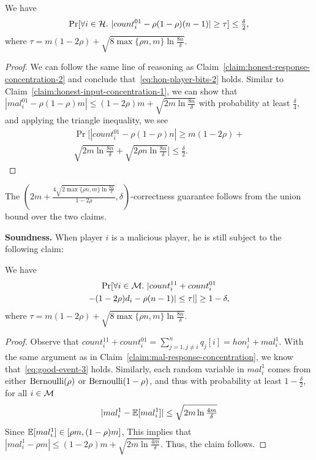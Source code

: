 \begin{claim}\label{claim:honest-input-concentration-2}
We have
\[
    \Pr[\forall i \in \mathcal{H}.~|count_i^{01} - \rho(1-\rho)(n-1)| \geq \tau] \leq \tfrac{\delta}{2},
\]
where $\tau = m(1-2\rho) + \sqrt{8 \max\{\rho n, m\} \ln \frac{8n}{\delta}}$.
\end{claim}

\begin{proof}
We can follow the same line of reasoning as Claim~\ref{claim:honest-response-concentration-2} and conclude that~\eqref{eq:hon-player-bits-2} holds.
Similar to Claim~\ref{claim:honest-input-concentration-1}, we can show that $|mal_i^{01} - \rho(1-\rho) m| \leq (1-2\rho)m + \sqrt{2m \ln \frac{8n}{\delta}}$ with probability at least $\frac{\delta}{4}$, and applying the triangle inequality, we see
\begin{multline*}
    \Pr[|count_i^{01} - \rho(1-\rho)n| \geq m(1-2\rho) + \\ \sqrt{2m \ln \tfrac{8n}{\delta}}  + \sqrt{2\rho n \ln \tfrac{8n}{\delta}}] \leq \tfrac{\delta}{2}.
\end{multline*}
\end{proof}

The $(2m+\frac{4\sqrt{2 \max\{\rho n, m\} \ln \frac{8n}{\delta}}}{1-2\rho}, \delta)$-correctness guarantee follows from the union bound over the two claims.

\textbf{Soundness.}
When player $i$ is a malicious player, he is still subject to the following claim:

\begin{claim}\label{claim:mal-input-concentration}
We have
\begin{multline*}
    \Pr[\forall i \in \mathcal{M}.~|count_i^{11} + count_i^{01} \\ -(1-2\rho)d_i - \rho(n-1)| \leq \tau|] \geq 1-\delta,
\end{multline*}
where $\tau = m(1-2\rho) + \sqrt{8 \max\{\rho n, m\} \ln \frac{8n}{\delta}}$.
\end{claim}
\begin{proof}
Observe that $count_i^{11} + count_i^{01} = \sum_{j=1,j\neq i}^n q_{j}[i] = hon_i^1 + mal_i^1$. With the same argument as in Claim~\ref{claim:mal-response-concentration}, we know that~\eqref{eq:good-event-3} holds. Similarly, each random variable in $mal_i^1$ comes from either $\textnormal{Bernoulli}(\rho)$ or $\textnormal{Bernoulli}(1-\rho)$, and thus with probability at least $1-\frac{\delta}{2}$, for all $i \in \mathcal{M}$
\[
    |mal_i^1 - \operatorname{\mathbb{E}}[mal_i^1]| \leq \sqrt{2m \ln \tfrac{4m}{\delta}}
\]
Since $\operatorname{\mathbb{E}}[mal_i^1] \in [\rho m, (1-\rho) m]$, 
This implies that $|mal_i^1 - \rho m | \leq  (1-2\rho)m + \sqrt{2m \ln \frac{4m}{\delta}}$. Thus, the claim follows.
\end{proof}

